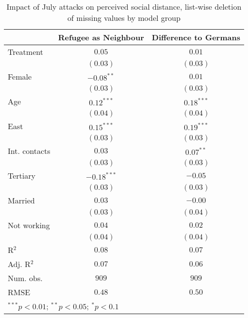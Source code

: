
\begin{table}
\caption{Impact of July attacks on perceived social distance, list-wise deletion of missing values by model group}
\begin{center}
\begin{tabular}{l c c}
\toprule
 & Refugee as Neighbour & Difference to Germans \\
\midrule
Treatment     & $0.05$        & $0.01$       \\
              & $(0.03)$      & $(0.03)$     \\
Female        & $-0.08^{**}$  & $0.01$       \\
              & $(0.03)$      & $(0.03)$     \\
Age           & $0.12^{***}$  & $0.18^{***}$ \\
              & $(0.04)$      & $(0.04)$     \\
East          & $0.15^{***}$  & $0.19^{***}$ \\
              & $(0.03)$      & $(0.03)$     \\
Int. contacts & $0.03$        & $0.07^{**}$  \\
              & $(0.03)$      & $(0.03)$     \\
Tertiary      & $-0.18^{***}$ & $-0.05$      \\
              & $(0.03)$      & $(0.03)$     \\
Married       & $0.03$        & $-0.00$      \\
              & $(0.03)$      & $(0.04)$     \\
Not working   & $0.04$        & $0.02$       \\
              & $(0.04)$      & $(0.04)$     \\
\midrule
R$^2$         & $0.08$        & $0.07$       \\
Adj. R$^2$    & $0.07$        & $0.06$       \\
Num. obs.     & $909$         & $909$        \\
RMSE          & $0.48$        & $0.50$       \\
\bottomrule
\multicolumn{3}{l}{\scriptsize{$^{***}p<0.01$; $^{**}p<0.05$; $^{*}p<0.1$}}
\end{tabular}
\label{tab_dist_na_group}
\end{center}
\end{table}
